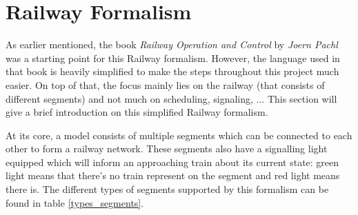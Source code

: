 \documentclass{article}
\begin{document}
\newpage
\section{Railway Formalism}

As earlier mentioned, the book \textit{Railway Operation and Control} by \textit{Joern Pachl} \cite{railway_book} was a starting point for this Railway formalism. However, the language used in that book is heavily simplified to make the steps throughout this project much easier. On top of that, the focus mainly lies on the railway (that consists of different segments) and not much on scheduling, signaling, ... This section will give a brief introduction on this simplified Railway formalism.

At its core, a model consists of multiple segments which can be connected to each other to form a railway network. These segments also have a signalling light equipped which will inform an approaching train about its current state: green light means that there's no train represent on the segment and red light means there is. The different types of segments supported by this formalism can be found in table \ref{types_segments}.
\end{document}
